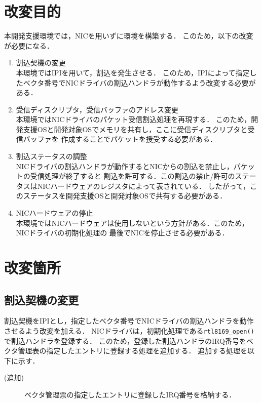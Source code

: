 \documentclass[12pt]{jsarticle}
\begin{document}
\section{改変目的}
本開発支援環境では，NICを用いずに環境を構築する．
このため，以下の改変が必要になる．
\begin{enumerate}
    \item 割込契機の変更\\
        本環境ではIPIを用いて，割込を発生させる．
        このため，IPIによって指定したベクタ番号でNICドライバの割込ハンドラが動作するよう改変する必要がある．
    \item 受信ディスクリプタ，受信バッファのアドレス変更\\
        本環境ではNICドライバのパケット受信割込処理を再現する．
        このため，開発支援OSと開発対象OSでメモリを共有し，ここに受信ディスクリプタと受信バッファを
        作成することでパケットを授受する必要がある．
    \item 割込ステータスの調整\\
        NICドライバの割込ハンドラが動作するとNICからの割込を禁止し，パケットの受信処理が終了すると
        割込を許可する．この割込の禁止/許可のステータスはNICハードウェアのレジスタによって表されている．
        したがって，このステータスを開発支援OSと開発対象OSで共有する必要がある．
    \item NICハードウェアの停止\\
        本環境ではNICハードウェアは使用しないという方針がある．このため，NICドライバの初期化処理の
        最後でNICを停止させる必要がある．
\end{enumerate}

\section{改変箇所}\label{kaihenkasyo}

\subsection{割込契機の変更}
割込契機をIPIとし，指定したベクタ番号でNICドライバの割込ハンドラを動作させるよう改変を加える．
NICドライバは，初期化処理である{\tt rtl8169\_open()}で割込ハンドラを登録する．
このため，登録した割込ハンドラのIRQ番号をベクタ管理表の指定したエントリに登録する処理を追加する．
追加する処理を以下に示す．
\begin{description}
    \item[(追加)]ベクタ管理票の指定したエントリに登録したIRQ番号を格納する．
\end{description}
\end{document}
